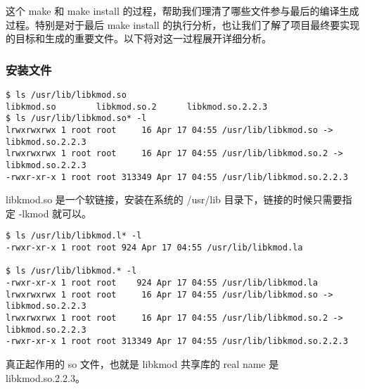 \documentclass[11pt,a4paper]{article}
\begin{document}
这个 make 和 make install
的过程，帮助我们理清了哪些文件参与最后的编译生成过程。特别是对于最后 make
install
的执行分析，也让我们了解了项目最终要实现的目标和生成的重要文件。以下将对这一过程展开详细分析。

\subsubsection{安装文件}

{\begin{shaded}\begin{verbatim}
$ ls /usr/lib/libkmod.so
libkmod.so        libkmod.so.2      libkmod.so.2.2.3  
$ ls /usr/lib/libkmod.so* -l
lrwxrwxrwx 1 root root     16 Apr 17 04:55 /usr/lib/libkmod.so -> libkmod.so.2.2.3
lrwxrwxrwx 1 root root     16 Apr 17 04:55 /usr/lib/libkmod.so.2 -> libkmod.so.2.2.3
-rwxr-xr-x 1 root root 313349 Apr 17 04:55 /usr/lib/libkmod.so.2.2.3
\end{verbatim}\end{shaded}}
libkmod.so 是一个软链接，安装在系统的 /usr/lib
目录下，链接的时候只需要指定 -lkmod 就可以。

{\begin{shaded}\begin{verbatim}
$ ls /usr/lib/libkmod.l* -l
-rwxr-xr-x 1 root root 924 Apr 17 04:55 /usr/lib/libkmod.la

$ ls /usr/lib/libkmod.* -l
-rwxr-xr-x 1 root root    924 Apr 17 04:55 /usr/lib/libkmod.la
lrwxrwxrwx 1 root root     16 Apr 17 04:55 /usr/lib/libkmod.so -> libkmod.so.2.2.3
lrwxrwxrwx 1 root root     16 Apr 17 04:55 /usr/lib/libkmod.so.2 -> libkmod.so.2.2.3
-rwxr-xr-x 1 root root 313349 Apr 17 04:55 /usr/lib/libkmod.so.2.2.3
\end{verbatim}\end{shaded}}
真正起作用的 so 文件，也就是 libkmod 共享库的 real name 是
libkmod.so.2.2.3。
\end{document}
